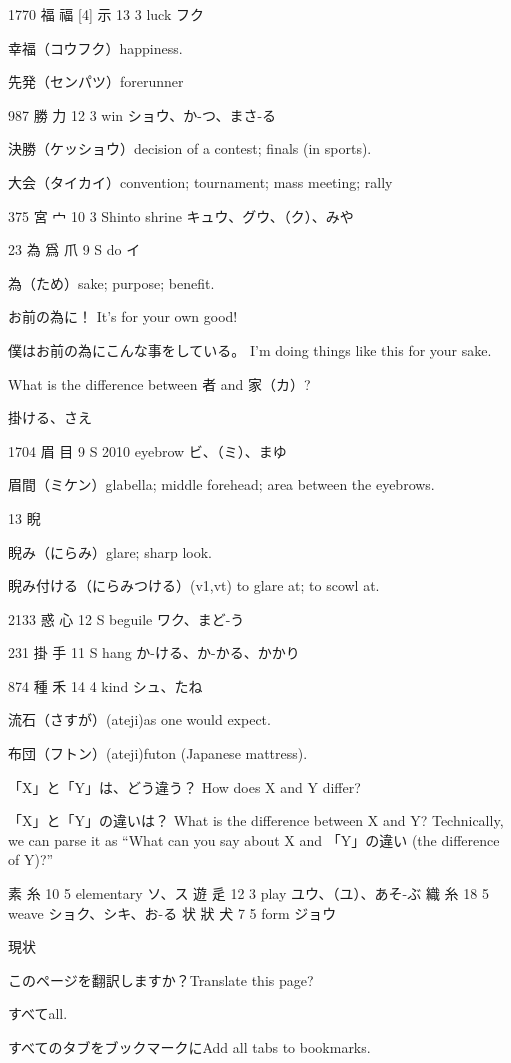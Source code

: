 1770	福	福 [4]	示	13	3		luck	フク

幸福（コウフク）happiness.

先発（センパツ）forerunner

987	勝		力	12	3		win	ショウ、か-つ、まさ-る

決勝（ケッショウ）decision of a contest; finals (in sports).

大会（タイカイ）convention; tournament; mass meeting; rally

375	宮		宀	10	3		Shinto shrine	キュウ、グウ、（ク）、みや

23	為	爲	爪	9	S		do	イ

為（ため）sake; purpose; benefit.

お前の為に！
It's for your own good!

僕はお前の為にこんな事をしている。
I'm doing things like this for your sake.

What is the difference between 者 and 家（カ）?

掛ける、さえ

1704	眉		目	9	S	2010	eyebrow	ビ、（ミ）、まゆ

眉間（ミケン）glabella; middle forehead; area between the eyebrows.

13 睨

睨み（にらみ）glare; sharp look.

睨み付ける（にらみつける）(v1,vt) to glare at; to scowl at.

2133	惑		心	12	S		beguile	ワク、まど-う

231	掛		手	11	S		hang	か-ける、か-かる、かかり

874	種		禾	14	4		kind	シュ、たね

流石（さすが）(ateji)as one would expect.

布団（フトン）(ateji)futon (Japanese mattress).

「X」と「Y」は、どう違う？
How does X and Y differ?

「X」と「Y」の違いは？
What is the difference between X and Y?
Technically, we can parse it as
``What can you say about X and 「Y」の違い (the difference of Y)?''

素  糸 10 5  elementary ソ、ス
遊  辵 12 3  play ユウ、（ユ）、あそ-ぶ
織  糸 18 5  weave ショク、シキ、お-る
状 狀 犬 7 5  form ジョウ

現状

このページを翻訳しますか？Translate this page?

すべてall.

すべてのタブをブックマークにAdd all tabs to bookmarks.

